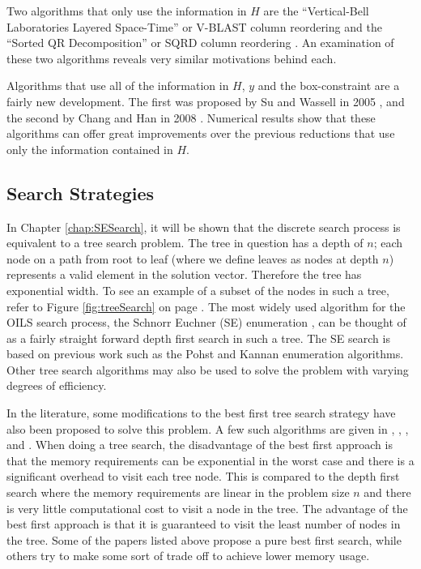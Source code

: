 \documentclass[12pt,Bold,letterpaper]{mcgilletdclass}
\newcommand{\vsp}{\vspace{\baselineskip}}
\begin{document}
Two algorithms that only use the information in $H$ are the ``Vertical-Bell Laboratories Layered Space-Time'' or V-BLAST column reordering \cite{FosGVW99} and the ``Sorted QR Decomposition'' or SQRD column reordering \cite{WubBRKK01}. An examination of these two algorithms reveals very similar motivations behind each.

Algorithms that use all of the information in $H$, $y$ and the box-constraint are a fairly new development. The first was proposed by Su and Wassell in 2005 \cite{SuW05}, and the second by Chang and Han in 2008 \cite{ChaH05}. Numerical results show that these algorithms can offer great improvements over the previous reductions that use only the information contained in $H$.

\vsp \subsection{Search Strategies}
In Chapter \ref{chap:SESearch}, it will be shown that the discrete search process is equivalent to a tree search problem. The tree in question has a depth of $n$; each node on a path from root to leaf (where we define leaves as nodes at depth $n$) represents a valid element in the solution vector. Therefore the tree has exponential width. To see an example of a subset of the nodes in such a tree, refer to Figure \ref{fig:treeSearch} on page \pageref{fig:treeSearch}. The most widely used algorithm for the OILS search process, the Schnorr Euchner (SE) enumeration \cite{SchE94}, can be thought of as a fairly straight forward depth first search in such a tree. The SE search is based on previous work such as the Pohst \cite{Pho81} and Kannan \cite{Kan83} enumeration algorithms. Other tree search algorithms may also be used to solve the problem with varying degrees of efficiency.

In the literature, some modifications to the best first tree search strategy have also been proposed to solve this problem. A few such algorithms are given in \cite{MurGDC06}, \cite{XuWZW04}, \cite{FukMU04}, \cite{StuBF07} and \cite{DaiY08}. When doing a tree search, the disadvantage of the best first approach is that the memory requirements can be exponential in the worst case and there is a significant overhead to visit each tree node. This is compared to the depth first search where the memory requirements are linear in the problem size $n$ and there is very little computational cost to visit a node in the tree. The advantage of the best first approach is that it is guaranteed to visit the least number of nodes in the tree. Some of the papers listed above propose a pure best first search, while others try to make some sort of trade off to achieve lower memory usage.
\end{document}

